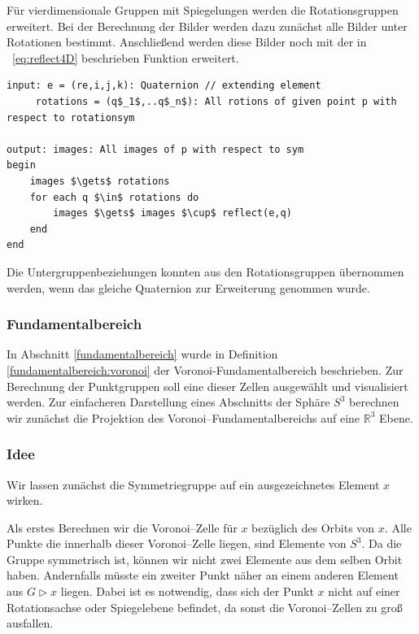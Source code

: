 Für vierdimensionale Gruppen mit Spiegelungen werden die Rotationsgruppen erweitert. Bei der Berechnung der Bilder werden dazu zunächst alle Bilder unter Rotationen bestimmt. Anschließend werden diese Bilder noch mit der in ~\ref{eq:reflect4D} beschrieben Funktion erweitert. 
\begin{lstlisting}[mathescape, morekeywords={for, each, if, then, fi, do, begin,input, output, end, return}, caption={Peusdocode zur Berechnung aller Bilder unter Spiegelungen}, label=alg:images2]
input: e = (re,i,j,k): Quaternion // extending element
	 rotations = (q$_1$,..q$_n$): All rotions of given point p with respect to rotationsym
	
output: images: All images of p with respect to sym
begin	
	images $\gets$ rotations
	for each q $\in$ rotations do
		images $\gets$ images $\cup$ reflect(e,q)
	end
end 
\end{lstlisting}
Die Untergruppenbeziehungen konnten aus den Rotationsgruppen übernommen werden, wenn das gleiche Quaternion zur Erweiterung genommen wurde.
\\ 


    \subsubsection{Fundamentalbereich}
         In Abschnitt \ref{fundamentalbereich} wurde in Definition \ref{fundamentalbereich:voronoi} der Voronoi-Fundamentalbereich beschrieben. Zur Berechnung der Punktgruppen soll eine dieser Zellen ausgewählt und visualisiert werden.
         Zur einfacheren Darstellung eines Abschnitts der Sphäre $S^3$ berechnen wir zunächst die Projektion des Voronoi--Fundamentalbereichs auf eine $\mathbb{R}^3$ Ebene.
        \subsubsection*{Idee}
            Wir lassen zunächst die Symmetriegruppe auf ein ausgezeichnetes Element $x$ wirken.

            \noindent Als erstes Berechnen wir die Voronoi--Zelle für $x$ bezüglich des Orbits von $x$. Alle Punkte die innerhalb dieser Voronoi--Zelle liegen, sind Elemente von $S^3$. 
            Da die Gruppe symmetrisch ist, können wir nicht zwei Elemente aus dem selben Orbit haben. 
            Andernfalls müsste ein zweiter Punkt näher an einem anderen Element aus $G \rhd x$ liegen.
            Dabei ist es notwendig, dass sich der Punkt $x$ nicht auf einer Rotationsachse oder Spiegelebene befindet, da sonst die Voronoi--Zellen zu groß ausfallen.
            
